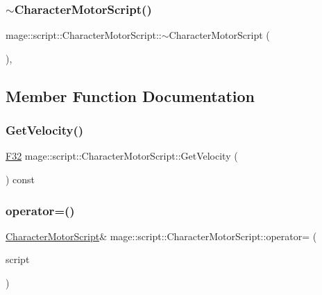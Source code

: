 \subsubsection{\texorpdfstring{$\sim$\+Character\+Motor\+Script()}{~CharacterMotorScript()}}
{\footnotesize\ttfamily mage\+::script\+::\+Character\+Motor\+Script\+::$\sim$\+Character\+Motor\+Script (\begin{DoxyParamCaption}{ }\end{DoxyParamCaption})\hspace{0.3cm}{\ttfamily [virtual]}, {\ttfamily [default]}}



\subsection{Member Function Documentation}
\hypertarget{classmage_1_1script_1_1_character_motor_script_a24edb3337af40e7326c424bc6b93c3fa}{}\label{classmage_1_1script_1_1_character_motor_script_a24edb3337af40e7326c424bc6b93c3fa} 
\subsubsection{\texorpdfstring{Get\+Velocity()}{GetVelocity()}}
{\footnotesize\ttfamily \hyperlink{namespacemage_aa97e833b45f06d60a0a9c4fc22ae02c0}{F32} mage\+::script\+::\+Character\+Motor\+Script\+::\+Get\+Velocity (\begin{DoxyParamCaption}{ }\end{DoxyParamCaption}) const\hspace{0.3cm}{\ttfamily [noexcept]}}

\hypertarget{classmage_1_1script_1_1_character_motor_script_ac0367e5e6fb8adfe3b9a962f1ca72b4c}{}\label{classmage_1_1script_1_1_character_motor_script_ac0367e5e6fb8adfe3b9a962f1ca72b4c} 
\subsubsection{\texorpdfstring{operator=()}{operator=()}\hspace{0.1cm}{\footnotesize\ttfamily [1/2]}}
{\footnotesize\ttfamily \hyperlink{classmage_1_1script_1_1_character_motor_script}{Character\+Motor\+Script}\& mage\+::script\+::\+Character\+Motor\+Script\+::operator= (\begin{DoxyParamCaption}\item[{const \hyperlink{classmage_1_1script_1_1_character_motor_script}{Character\+Motor\+Script} \&}]{script }\end{DoxyParamCaption})\hspace{0.3cm}{\ttfamily [delete]}}

